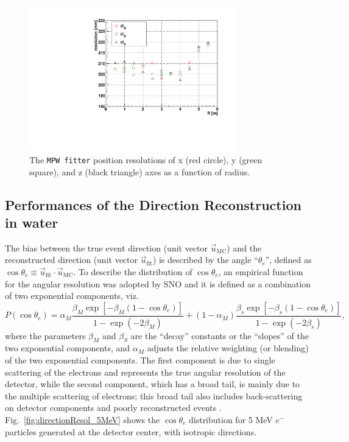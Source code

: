 \begin{figure}[htbp]
	\centering	
	\includegraphics[width=9cm]{shellTest_RvsResol.pdf}
	\caption[The \texttt{MPW fitter} position resolutions ($\sigma_{x,y,z}$) as a function of energies.]{The \texttt{MPW fitter} position resolutions of x (red circle), y (green square), and z (black triangle) axes as a function of radius.}
	\label{fig:FitResolVsShell}
\end{figure}
 
\subsection{Performances of the Direction Reconstruction in water}\label{sect:directResol}

The bias between the true event direction (unit vector $\vec{u}_{\mathrm{MC}}$) and the reconstructed direction (unit vector $\vec{u}_{\mathrm{fit}}$) is described by the angle ``$\theta_e$'', defined as $\cos\theta_e \equiv \vec{u}_{\mathrm{fit}} \cdot \vec{u}_{\mathrm{MC}}$. To describe the distribution of $\cos\theta_e$, an empirical function for the angular resolution was adopted by SNO\cite{boulay2004direct} and it is defined as a combination of two exponential components, viz.
\begin{equation}\label{eq:directResol}
P(\cos\theta_e)=\alpha_M\frac{\beta_M\exp[-\beta_M(1-\cos\theta_e)]}{1-\exp(-2\beta_M)}+(1-\alpha_M)\frac{\beta_s\exp[-\beta_s(1-\cos\theta_e)]}{1-\exp(-2\beta_s)},
\end{equation}
where the parameters $\beta_M$ and $\beta_S$ are the ``decay'' constants or the ``slopes'' of the two exponential components, and $\alpha_M$ adjusts the relative weighting (or blending) of the two exponential components. The first component is due to single scattering of the electrons and represents the true angular resolution of the detector, while the second component, which has a broad tail, is mainly due to the multiple scattering of electrons; this broad tail also includes back-scattering on detector components and poorly reconstructed events \cite{boulay2004direct}. Fig.~\ref{fig:directionResol_5MeV} shows the $\cos\theta_e$ distribution for 5 MeV $e^-$ particles generated at the detector center, with isotropic directions.

